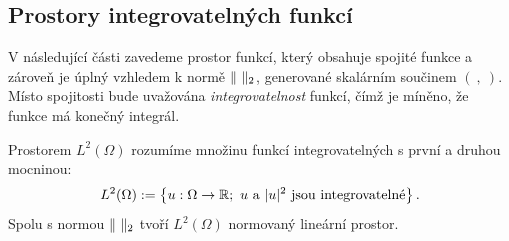 % 
% 
% 





\subsection{Prostory integrovatelných funkcí}

V následující části zavedeme prostor funkcí, který obsahuje spojité funkce a zároveň je úplný vzhledem k normě $\|\ \|_2$, generované skalárním součinem $(\ ,\ )$.
Místo spojitosti bude uvažována \emph{integrovatelnost} funkcí, čímž je míněno, že funkce má konečný integrál.

\begin{df}
\label{df:Lp}
Prostorem $L^2(\Omega)$ rozumíme množinu funkcí integrovatelných s první a druhou mocninou:
\[ L^2(\Omega):=\left\{u:\Omega\rightarrow\mathbb R;~u \mbox{ a } |u|^2 \mbox{ jsou integrovatelné} \right\}. \]
Spolu s normou $\|\ \|_2$ tvoří $L^2(\Omega)$ normovaný lineární prostor.
\end{df}

